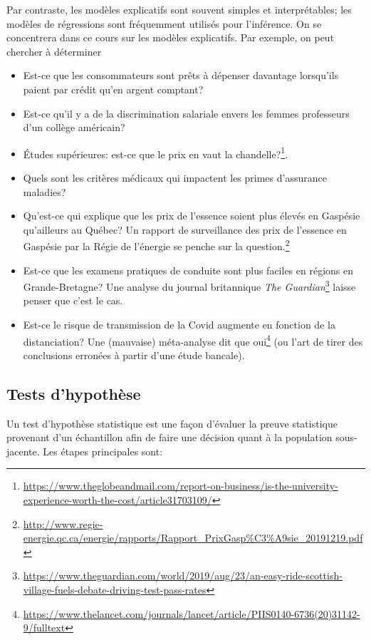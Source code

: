 \documentclass[
  11pt,
  letterpaper,
]{article}
\providecommand{\tightlist}{%
  \setlength{\itemsep}{0pt}\setlength{\parskip}{0pt}}
\renewcommand{\href}[2]{#2\footnote{\url{#1}}}
\theoremstyle{definition}
\theoremstyle{definition}
\theoremstyle{definition}
\theoremstyle{remark}
\begin{document}
Par contraste, les modèles explicatifs sont souvent simples et interprétables; les modèles de régressions sont fréquemment utilisés pour l'inférence. On se concentrera dans ce cours sur les modèles explicatifs. Par exemple, on peut chercher à déterminer

\begin{itemize}
\tightlist
\item
  Est-ce que les consommateurs sont prêts à dépenser davantage lorsqu'ils paient par crédit qu'en argent comptant?
\item
  Est-ce qu'il y a de la discrimination salariale envers les femmes professeurs d'un collège américain?
\item
  Études supérieures: \href{https://www.theglobeandmail.com/report-on-business/is-the-university-experience-worth-the-cost/article31703109/}{est-ce que le prix en vaut la chandelle?}.
\item
  Quels sont les critères médicaux qui impactent les primes d'assurance maladies?
\item
  Qu'est-ce qui explique que les prix de l'essence soient plus élevés en Gaspésie qu'ailleurs au Québec? \href{http://www.regie-energie.qc.ca/energie/rapports/Rapport_PrixGasp\%C3\%A9sie_20191219.pdf}{Un rapport de surveillance des prix de l'essence en Gaspésie par la Régie de l'énergie se penche sur la question.}
\item
  Est-ce que les examens pratiques de conduite sont plus faciles en régions en Grande-Bretagne? \href{https://www.theguardian.com/world/2019/aug/23/an-easy-ride-scottish-village-fuels-debate-driving-test-pass-rates}{Une analyse du journal britannique \emph{The Guardian}} laisse penser que c'est le cas.
\item
  Est-ce le risque de transmission de la Covid augmente en fonction de la distanciation? \href{https://www.thelancet.com/journals/lancet/article/PIIS0140-6736(20)31142-9/fulltext}{Une (mauvaise) méta-analyse dit que oui} (ou l'art de tirer des conclusions erronées à partir d'une étude bancale).
\end{itemize}

\hypertarget{tests}{%
\subsection{Tests d'hypothèse}\label{tests}}

Un test d'hypothèse statistique est une façon d'évaluer la preuve statistique provenant d'un échantillon afin de faire une décision quant à la population sous-jacente. Les étapes principales sont:
\end{document}
